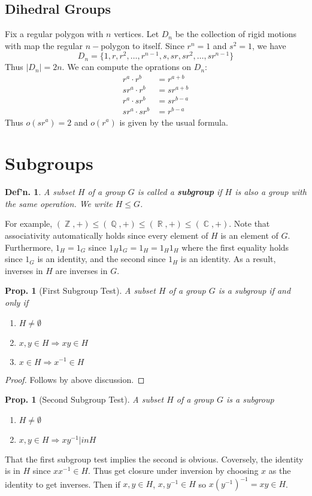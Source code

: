\documentclass[12pt, a4paper]{book}
\DeclareMathOperator{\Q}{\mathbb{Q}}
\DeclareMathOperator{\Z}{\mathbb{Z}}
\DeclareMathOperator{\R}{\mathbb{R}}
\DeclareMathOperator{\C}{\mathbb{C}}
\newtheorem{definition}[theorem]{Def'n.}
\newtheorem{proposition}[theorem]{Prop.}
\theoremstyle{nonumberplain}
\newtheorem{proof}{Proof}
\begin{document}
\subsection{Dihedral Groups}
Fix a regular polygon with $n$ vertices.
Let $D_n$ be the collection of rigid motions with map the regular $n-$polygon to itself.
Since $r^n=1$ and $s^2=1$, we have
\[D_n=\{1,r,r^2,\ldots,r^{n-1},s,sr,sr^2,\ldots,sr^{n-1}\}\]
Thus $|D_n|=2n$.
We can compute the oprations on $D_n$:
\begin{align*}
    r^a\cdot r^b &= r^{a+b}\\
    sr^a\cdot r^b &= sr^{a+b}\\
    r^a\cdot sr^b &= sr^{b-a}\\
    sr^a\cdot sr^b &= r^{b-a}
\end{align*}
Thus $o(sr^a)=2$ and $o(r^a)$ is given by the usual formula.
\section{Subgroups}
\begin{definition}
    A subset $H$ of a group $G$ is called a \textbf{subgroup} if $H$ is also a group with the same operation.
    We write $H\leq G$.
\end{definition}
For example, $(\Z,+)\leq(\Q,+)\leq(\R,+)\leq(\C,+)$.
Note that associativity automatically holds since every element of $H$ is an element of $G$.
Furthermore, $1_H=1_G$ since $1_H1_G=1_H=1_H1_H$ where the first equality holds since $1_G$ is an identity, and the second since $1_H$ is an identity.
As a result, inverses in $H$ are inverses in $G$.
\begin{proposition}[First Subgroup Test]
    A subset $H$ of a group $G$ is a subgroup if and only if
    \begin{enumerate}
        \item $H\neq\emptyset$
        \item $x,y\in H\Rightarrow xy\in H$
        \item $x\in H\Rightarrow x^{-1}\in H$
    \end{enumerate}
\end{proposition}
\begin{proof}
    Follows by above discussion.
\end{proof}
\begin{proposition}[Second Subgroup Test]
    A subset $H$ of a group $G$ is a subgroup
    \begin{enumerate}
        \item $H\neq\emptyset$
        \item $x,y\in H\Rightarrow xy^{-1}|in H$
    \end{enumerate}
\end{proposition}
That the first subgroup test implies the second is obvious.
Coversely, the identity is in $H$ since $xx^{-1}\in H$.
Thus get closure under inversion by choosing $x$ as the identity to get inverses.
Then if $x,y\in H$, $x,y^{-1}\in H$ so $x(y^{-1})^{-1}=xy\in H$.
\end{document}
